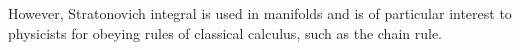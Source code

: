 \documentclass[12pt,a4paper]{article}
\theoremstyle{definition}
\newtheorem{theorem}{Theorem}[section]
\begin{document}
However, Stratonovich integral is used in manifolds and is of particular interest to physicists for obeying rules of classical calculus, such as the chain rule.


%

%	
%
%
%
%
%
%
%
%
\end{document}
